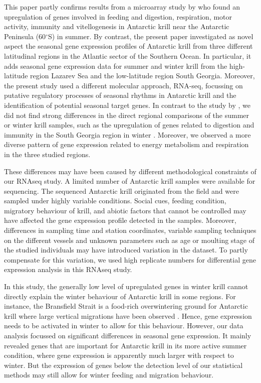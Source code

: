 This paper partly confirms results from a microarray study by
\citet{seear_seasonal_2012} who found an upregulation of genes involved in
feeding and digestion, respiration, motor activity, immunity and vitellogenesis
in Antarctic krill near the Antarctic Peninsula (60$^{\circ}$S) in summer. By
contrast, the present paper investigated as novel aspect the seasonal gene
expression profiles of Antarctic krill from three different latitudinal regions
in the Atlantic sector of the Southern Ocean. In particular, it adds seasonal
gene expression data for summer and winter krill from the high-latitude region
Lazarev Sea and the low-latitude region South Georgia. Moreover, the present
study used a different molecular approach, RNA-seq, focussing on putative
regulatory processes of seasonal rhythms in Antarctic krill and the
identification of potential seasonal target genes. In contrast to the study by
\citet{seear_seasonal_2012}, we did not find strong differences in the direct
regional comparisons of the summer or winter krill samples, such as the
upregulation of genes related to digestion and immunity in the South Georgia
region in winter \citep{seear_seasonal_2012}.  Moreover, we observed a more
diverse pattern of gene expression related to energy metabolism and respiration
in the three studied regions.

These differences may have been caused by different methodological constraints
of our RNAseq study. A limited number of Antarctic krill samples were available
for sequencing. The sequenced Antarctic krill originated from the field and
were sampled under highly variable conditions. Social cues, feeding condition,
migratory behaviour of krill, and abiotic factors that cannot be controlled may
have affected the gene expression profile detected in the samples. Moreover,
differences in sampling time and station coordinates, variable sampling
techniques on the different vessels and unknown parameters such as age or
moulting stage of the studied individuals may have introduced variation in the
dataset. To partly compensate for this variation, we used high replicate
numbers for differential gene expression analysis in this RNAseq study.

In this study, the generally low level of upregulated genes in winter krill
cannot directly explain the winter behaviour of Antarctic krill in some
regions. For instance, the Bransfield Strait is a food-rich overwintering
ground for Antarctic krill where large vertical migrations have been observed
\citep{bernard_contribution_2018, reiss_overwinter_2017}. Hence, gene
expression needs to be activated in winter to allow for this behaviour.
However, our data analysis focussed on significant differences in seasonal gene
expression. It mainly revealed genes that are important for Antarctic krill in
its more active summer condition, where gene expression is apparently much
larger with respect to winter. But the expression of genes below the detection
level of our statistical methods may still allow for winter feeding and
migration behaviour.

